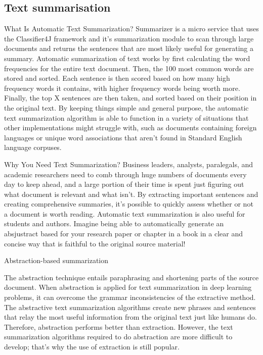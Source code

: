 \documentclass[12pt,a4paper]{article}
\begin{document}
\subsection{Text summarisation}
\par What Is Automatic Text Summarization? Summarizer is a micro service that uses the Classifier4J framework and it’s summarization module to scan through large documents and returns the sentences that are most likely useful for generating a summary.
Automatic summarization of text works by first calculating the word frequencies for the entire text document. Then, the 100 most common words are stored and sorted. Each sentence is then scored based on how many high frequency words it contains, with higher frequency words being worth more. Finally, the top X sentences are then taken, and sorted based on their position in the original text.
By keeping things simple and general purpose, the automatic text summarization algorithm is able to function in a variety of situations that other implementations might struggle with, such as documents containing foreign languages or unique word associations that aren’t found in Standard English language corpuses.
\par Why You Need Text Summarization? Business leaders, analysts, paralegals, and academic researchers need to comb through huge numbers of documents every day to keep ahead, and a large portion of their time is spent just figuring out what document is relevant and what isn’t. By extracting important sentences and creating comprehensive summaries, it’s possible to quickly assess whether or not a document is worth reading.
Automatic text summarization is also useful for students and authors. Imagine being able to automatically generate an absjustract based for your research paper or chapter in a book in a clear and concise way that is faithful to the original source material!
\par	Abstraction-based summarization
\par The abstraction technique entails paraphrasing and shortening parts of the source document. When abstraction is applied for text summarization in deep learning problems, it can overcome the grammar inconsistencies of the extractive method.
The abstractive text summarization algorithms create new phrases and sentences that relay the most useful information from the original text just like humans do.
Therefore, abstraction performs better than extraction. However, the text summarization algorithms required to do abstraction are more difficult to develop; that’s why the use of extraction is still popular.
\end{document}
